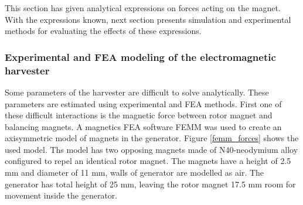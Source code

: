 \begin{table}[htb]
\caption{\label{parameters_of_lg} Effect of the parameters of the generator}
\begin{center}
\end{center}
\end{table}

This section has given analytical expressions on forces acting on the magnet. With the expressions known, next section presents simulation and experimental methods for evaluating the effects of these expressions.

\subsubsection{Experimental and FEA modeling of the electromagnetic harvester}
Some parameters of the harvester are difficult to solve analytically. These parameters are estimated using experimental and FEA methods. First one of these difficult interactions is the magnetic force between rotor magnet and balancing magnets. A magnetics FEA software FEMM \cite{Meeker2013} was used to create an axisymmetric model of magnets in the generator. Figure \ref{femm_forces} shows the used model. Ths model has two opposing magnets made of N40-neodymium alloy configured to repel an identical rotor magnet. The magnets have a height of 2.5 mm and diameter of 11 mm, walls of generator are modelled as air. The generator has total height of 25 mm, leaving the rotor magnet 17.5 mm room for movement inside the generator.

